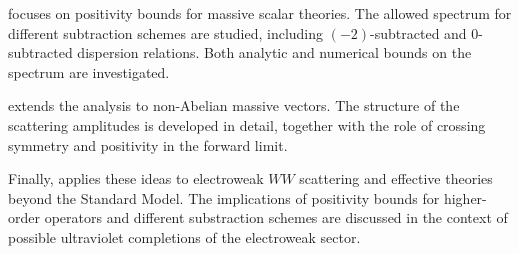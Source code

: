  focuses on positivity bounds for massive scalar theories. The allowed spectrum for different subtraction schemes are studied, including \((-2)\)-subtracted and \(0\)-subtracted dispersion relations. Both analytic and numerical bounds on the spectrum are investigated.

 extends the analysis to non-Abelian massive vectors. The structure of the scattering amplitudes is developed in detail, together with the role of crossing symmetry and positivity in the forward limit.

Finally,  applies these ideas to electroweak \(WW\) scattering and effective theories beyond the Standard Model. The implications of positivity bounds for higher-order operators and different substraction schemes are discussed in the context of possible ultraviolet completions of the electroweak sector.